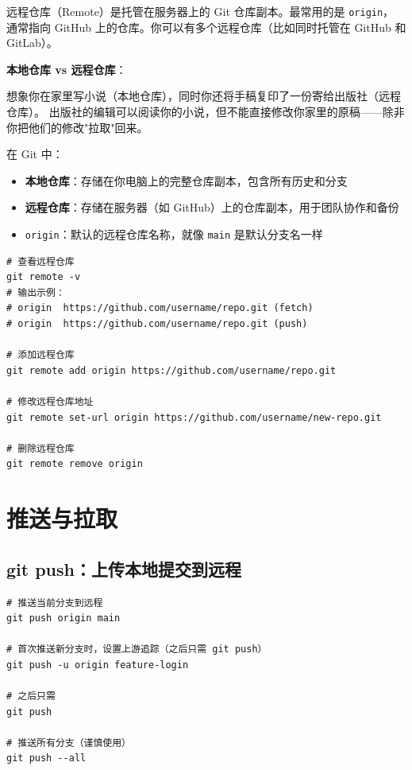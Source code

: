 \documentclass[12pt,a4paper,openany]{ctexbook}
\begin{document}
远程仓库（Remote）是托管在服务器上的 Git 仓库副本。最常用的是 \texttt{origin}，
通常指向 GitHub 上的仓库。你可以有多个远程仓库（比如同时托管在 GitHub 和 GitLab）。

\medskip
\textbf{本地仓库 vs 远程仓库}：

想象你在家里写小说（本地仓库），同时你还将手稿复印了一份寄给出版社（远程仓库）。
出版社的编辑可以阅读你的小说，但不能直接修改你家里的原稿——除非你把他们的修改"拉取"回来。

在 Git 中：
\begin{itemize}
  \item \textbf{本地仓库}：存储在你电脑上的完整仓库副本，包含所有历史和分支
  \item \textbf{远程仓库}：存储在服务器（如 GitHub）上的仓库副本，用于团队协作和备份
  \item \texttt{origin}：默认的远程仓库名称，就像 \texttt{main} 是默认分支名一样
\end{itemize}
\medskip

\begin{lstlisting}[style=shell]
# 查看远程仓库
git remote -v
# 输出示例：
# origin  https://github.com/username/repo.git (fetch)
# origin  https://github.com/username/repo.git (push)

# 添加远程仓库
git remote add origin https://github.com/username/repo.git

# 修改远程仓库地址
git remote set-url origin https://github.com/username/new-repo.git

# 删除远程仓库
git remote remove origin
\end{lstlisting}

\section{推送与拉取}

\subsection{git push：上传本地提交到远程}

\begin{lstlisting}[style=shell]
# 推送当前分支到远程
git push origin main

# 首次推送新分支时，设置上游追踪（之后只需 git push）
git push -u origin feature-login

# 之后只需
git push

# 推送所有分支（谨慎使用）
git push --all
\end{lstlisting}
\end{document}

